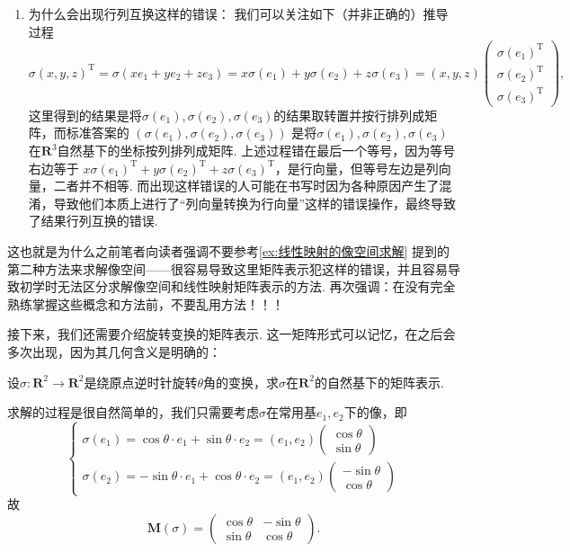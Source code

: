 \begin{enumerate}
    \item 为什么会出现行列互换这样的错误：
          我们可以关注如下（并非正确的）推导过程
          \[
            \sigma(x,y,z)^{\mathrm{T}}
            =\sigma(xe_1+ye_2+ze_3)
            =x\sigma(e_1)+y\sigma(e_2)+z\sigma(e_3)
            =(x,y,z)
            \begin{pmatrix}
                \sigma(e_1)^{\mathrm{T}} \\
                \sigma(e_2)^{\mathrm{T}} \\
                \sigma(e_3)^{\mathrm{T}}
            \end{pmatrix},
          \]
        这里得到的结果是将$\sigma(e_1),\sigma(e_2),\sigma(e_3)$的结果取转置并按行排列成矩阵，而标准答案的 $(\sigma(e_1), \sigma(e_2), \sigma(e_3))$ 是将$\sigma(e_1),\sigma(e_2),\sigma(e_3)$在$\mathbf{R}^3$自然基下的坐标按列排列成矩阵. 上述过程错在最后一个等号，因为等号右边等于 $x\sigma(e_1)^\mathrm{T}+y\sigma(e_2)^\mathrm{T}+z\sigma(e_3)^\mathrm{T}$，是行向量，但等号左边是列向量，二者并不相等. 而出现这样错误的人可能在书写时因为各种原因产生了混淆，导致他们本质上进行了``列向量转换为行向量''这样的错误操作，最终导致了结果行列互换的错误.
\end{enumerate}

这也就是为什么之前笔者向读者强调不要参考\autoref{ex:线性映射的像空间求解} 提到的第二种方法来求解像空间——很容易导致这里矩阵表示犯这样的错误，并且容易导致初学时无法区分求解像空间和线性映射矩阵表示的方法. 再次强调：在没有完全熟练掌握这些概念和方法前，不要乱用方法！！！

接下来，我们还需要介绍旋转变换的矩阵表示. 这一矩阵形式可以记忆，在之后会多次出现，因为其几何含义是明确的：
\begin{example}{}{}
    设$\sigma\colon\mathbf{R}^2\to\mathbf{R}^2$是绕原点逆时针旋转$\theta$角的变换，求$\sigma$在$\mathbf{R}^2$的自然基下的矩阵表示.
\end{example}
\begin{solution}
    求解的过程是很自然简单的，我们只需要考虑$\sigma$在常用基$e_1,e_2$下的像，即
    \[
    \begin{cases}
        \sigma(e_1)=\cos\theta\cdot e_1+\sin\theta\cdot e_2=(e_1,e_2)\begin{pmatrix}
            \cos\theta \\ \sin\theta
        \end{pmatrix} \\
        \sigma(e_2)=-\sin\theta\cdot e_1+\cos\theta\cdot e_2=(e_1,e_2)\begin{pmatrix}
            -\sin\theta \\ \cos\theta
        \end{pmatrix}
    \end{cases}
    \]
    故
    \[\mathbf{M}(\sigma)=\begin{pmatrix}
        \cos\theta & -\sin\theta \\
        \sin\theta & \cos\theta
    \end{pmatrix}.\]

\end{solution}

